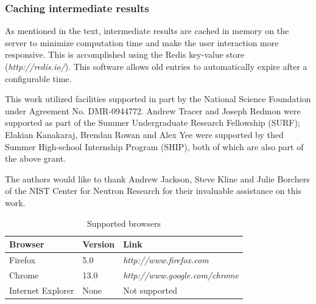 \documentclass[pdf]{iucr}           %
\begin{document}
\subsubsection{Caching intermediate results}
As mentioned in the text, intermediate results are cached 
in memory on the server to minimize computation time and make the user interaction more responsive.  
This is  accomplished using the Redis key-value store (\emph{http://redis.io/}).  This software allows 
old entries to automatically expire after a configurable time.



This work utilized facilities supported in part by the National Science Foundation under Agreement No. DMR-0944772.
Andrew Tracer and Joseph Redmon were supported as part of the Summer Undergraduate Research Fellowship (SURF);
Elakian Kanakaraj, Brendan Rowan and Alex Yee were supported by thed Summer High-school Internship Program (SHIP),
both of which are also part of the above grant.

The authors would like to thank Andrew Jackson, Steve Kline and Julie Borchers of the NIST Center for Neutron Research
for their invaluable assistance on this work.





\begin{table}
\caption{Supported browsers}
\label{table:browsers}
\begin{tabular}{ l l l }      %
 Browser    &Version  &Link     \\
\hline
 Firefox      & 5.0      & \emph{http://www.firefox.com}      \\
 Chrome      & 13.0      & \emph{http://www.google.com/chrome}    \\
 Internet Explorer      & None      & Not supported      \\
\end{tabular}
\end{table}
\end{document}
